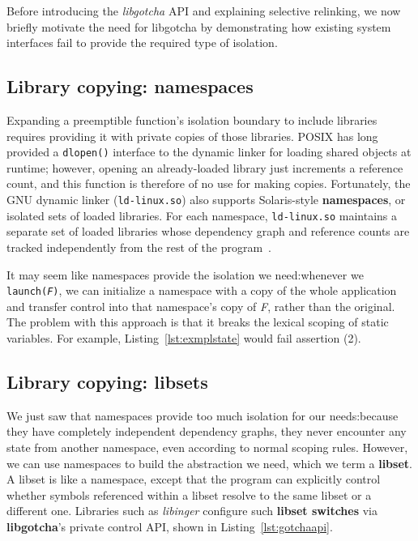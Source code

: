Before introducing the \textit{libgotcha} API and explaining selective relinking, we
now briefly motivate the need for libgotcha by demonstrating how existing system
interfaces fail to provide the required type of isolation.


\subsection{Library copying: namespaces}

Expanding a preemptible function's isolation boundary to include libraries requires
providing it with private copies of those libraries.  POSIX has long provided a
\texttt{dlopen()} interface to the dynamic linker for loading shared objects at
runtime; however, opening an already-loaded library just increments
a reference count, and this function is therefore of no use for making copies.
Fortunately, the GNU dynamic linker (\texttt{ld-linux.so}) also supports
Solaris-style \textbf{namespaces}, or isolated sets of loaded libraries.  For each
namespace, \texttt{ld-linux.so} maintains a separate set of loaded libraries whose
dependency graph and reference counts are tracked independently from the rest of the
program~\cite{dlmopen-manpage}.

It may seem like namespaces provide the isolation we need:\@ whenever we
\texttt{launch(\textnormal{\textit{F}})}, we can initialize a namespace with a copy
of the whole application and transfer control into that namespace's copy of
\textit{F}, rather than the original.  The problem with this approach is that it
breaks the lexical scoping of static variables.  For example,
Listing~\ref{lst:exmplstate} would fail assertion (2).



\subsection{Library copying: libsets}

We just saw that namespaces provide too much isolation
for our needs:\@ because they have completely independent dependency graphs, they
never encounter any state from another namespace, even according to normal scoping
rules.  However, we can use namespaces to build the abstraction we need, which we
term a \textbf{libset}.  A libset is like a namespace, except that the program can
explicitly control whether symbols referenced within a libset resolve to the same
libset or a different one.  Libraries such as \textit{libinger} configure such
\textbf{libset switches} via \textbf{libgotcha}'s private control API, shown
in Listing~\ref{lst:gotchaapi}.

